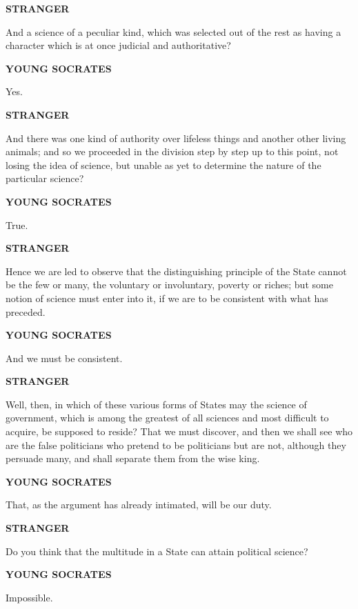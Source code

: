 \documentclass[11pt,letter]{article}
\begin{document}
\par \textbf{STRANGER}
\par   And a science of a peculiar kind, which was selected out of the rest as having a character which is at once judicial and authoritative?

\par \textbf{YOUNG SOCRATES}
\par   Yes.

\par \textbf{STRANGER}
\par   And there was one kind of authority over lifeless things and another other living animals; and so we proceeded in the division step by step up to this point, not losing the idea of science, but unable as yet to determine the nature of the particular science?

\par \textbf{YOUNG SOCRATES}
\par   True.

\par \textbf{STRANGER}
\par   Hence we are led to observe that the distinguishing principle of the State cannot be the few or many, the voluntary or involuntary, poverty or riches; but some notion of science must enter into it, if we are to be consistent with what has preceded.

\par \textbf{YOUNG SOCRATES}
\par   And we must be consistent.

\par \textbf{STRANGER}
\par   Well, then, in which of these various forms of States may the science of government, which is among the greatest of all sciences and most difficult to acquire, be supposed to reside? That we must discover, and then we shall see who are the false politicians who pretend to be politicians but are not, although they persuade many, and shall separate them from the wise king.

\par \textbf{YOUNG SOCRATES}
\par   That, as the argument has already intimated, will be our duty.

\par \textbf{STRANGER}
\par   Do you think that the multitude in a State can attain political science?

\par \textbf{YOUNG SOCRATES}
\par   Impossible.
\end{document}
